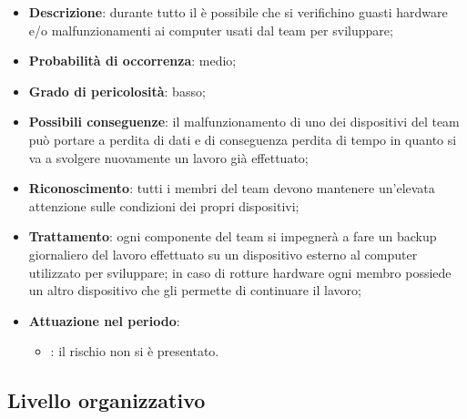 \documentclass[PianoDiProgetto.tex]{subfiles}
\begin{document}
		\begin{itemize}
		\item \textbf{Descrizione}: durante tutto il  è possibile che si verifichino guasti hardware e/o malfunzionamenti  ai computer usati dal team per sviluppare;
		\item \textbf{Probabilità di occorrenza}: medio;
		\item \textbf{Grado di pericolosità}: basso;
		\item \textbf{Possibili conseguenze}: il malfunzionamento di uno dei dispositivi del team può portare a perdita di dati e di conseguenza perdita di tempo in quanto si va a svolgere nuovamente un lavoro già effettuato;
		\item \textbf{Riconoscimento}: tutti i membri del team devono mantenere un'elevata attenzione sulle condizioni dei propri dispositivi;
		\item \textbf{Trattamento}: ogni componente del team si impegnerà a fare un backup giornaliero del lavoro effettuato su un dispositivo esterno al computer utilizzato per sviluppare; in caso di rotture hardware ogni membro possiede un altro dispositivo che gli permette di continuare il lavoro;
		\item \textbf{Attuazione nel periodo}: 
			\begin{itemize}
				\item \PerAR: il rischio non si è presentato.
			\end{itemize}
	
	\end{itemize}

	\subsection{Livello organizzativo}
\end{document}
